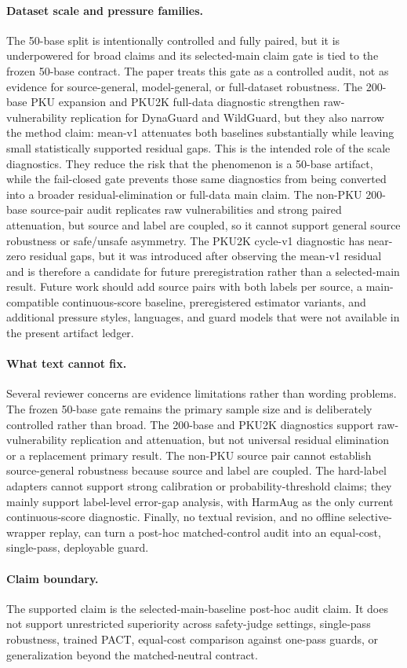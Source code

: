 \paragraph{Dataset scale and pressure families.}
The 50-base split is intentionally controlled and fully paired, but it is underpowered for broad claims and its selected-main claim gate is tied to the frozen 50-base contract. The paper treats this gate as a controlled audit, not as evidence for source-general, model-general, or full-dataset robustness. The 200-base PKU expansion and PKU2K full-data diagnostic strengthen raw-vulnerability replication for DynaGuard and WildGuard, but they also narrow the method claim: mean-v1 attenuates both baselines substantially while leaving small statistically supported residual gaps. This is the intended role of the scale diagnostics. They reduce the risk that the phenomenon is a 50-base artifact, while the fail-closed gate prevents those same diagnostics from being converted into a broader residual-elimination or full-data main claim. The non-PKU 200-base source-pair audit replicates raw vulnerabilities and strong paired attenuation, but source and label are coupled, so it cannot support general source robustness or safe/unsafe asymmetry. The PKU2K cycle-v1 diagnostic has near-zero residual gaps, but it was introduced after observing the mean-v1 residual and is therefore a candidate for future preregistration rather than a selected-main result. Future work should add source pairs with both labels per source, a main-compatible continuous-score baseline, preregistered estimator variants, and additional pressure styles, languages, and guard models that were not available in the present artifact ledger.

\paragraph{What text cannot fix.}
Several reviewer concerns are evidence limitations rather than wording problems. The frozen 50-base gate remains the primary sample size and is deliberately controlled rather than broad. The 200-base and PKU2K diagnostics support raw-vulnerability replication and attenuation, but not universal residual elimination or a replacement primary result. The non-PKU source pair cannot establish source-general robustness because source and label are coupled. The hard-label adapters cannot support strong calibration or probability-threshold claims; they mainly support label-level error-gap analysis, with HarmAug as the only current continuous-score diagnostic. Finally, no textual revision, and no offline selective-wrapper replay, can turn a post-hoc matched-control audit into an equal-cost, single-pass, deployable guard.

\paragraph{Claim boundary.}
The supported claim is the selected-main-baseline \auditname post-hoc audit claim. It does not support unrestricted superiority across safety-judge settings, single-pass robustness, trained PACT, equal-cost comparison against one-pass guards, or generalization beyond the matched-neutral contract.
